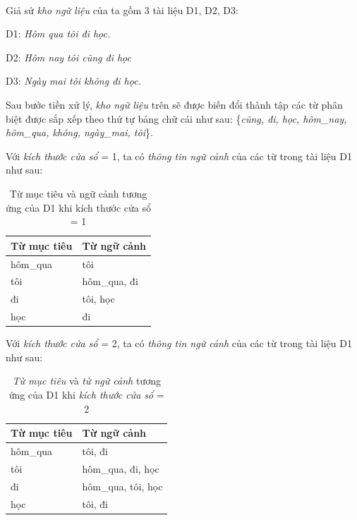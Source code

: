 \begin{exmp}
\label{ex:skip-gram-corpus}
\hrulefill\\
Giả sử \textit{kho ngữ liệu} của ta gồm 3 tài liệu D1, D2, D3:

	D1: \textit{Hôm qua tôi đi học.}

    D2: \textit{Hôm nay tôi cũng đi học}

    D3: \textit{Ngày mai tôi không đi học.}

Sau bước tiền xử lý, \textit{kho ngữ liệu} trên sẽ được biến đổi thành tập các từ phân biệt được sắp xếp theo thứ tự bảng chữ cái như sau: \{\textit{cũng, đi, học, hôm\_nay, hôm\_qua, không, ngày\_mai, tôi}\}.

Với \textit{kích thước cửa sổ} = 1, ta có \textit{thông tin ngữ cảnh} của các từ trong tài liệu D1 như sau:

\begin{table}[!h]
\centering
\begin{tabular}{|l|l|}
\hline
\textbf{Từ mục tiêu} & \textbf{Từ ngữ cảnh} \\ \hline
hôm\_qua             & tôi                  \\ \hline
tôi                  & hôm\_qua, đi         \\ \hline
đi                   & tôi, học             \\ \hline
học                  & đi                   \\ \hline
\end{tabular}
\caption{Từ mục tiêu và ngữ cảnh tương ứng của D1 khi kích thước cửa sổ = 1}
\label{tab:window-size-1}
\end{table}

Với \textit{kích thước cửa sổ} = 2, ta có \textit{thông tin ngữ cảnh} của các từ trong tài liệu D1 như sau:

\begin{table}[ht]
\centering
\begin{tabular}{|l|l|}
\hline
\textbf{Từ mục tiêu} & \textbf{Từ ngữ cảnh} \\ \hline
hôm\_qua             & tôi, đi              \\ \hline
tôi                  & hôm\_qua, đi, học    \\ \hline
đi                   & hôm\_qua, tôi, học   \\ \hline
học                  & tôi, đi              \\ \hline
\end{tabular}
\caption{\textit{Từ mục tiêu} và \textit{từ ngữ cảnh} tương ứng của D1 khi \textit{kích thước cửa sổ} = 2}
\label{tab:window-size-2}
\end{table}

\end{exmp}

